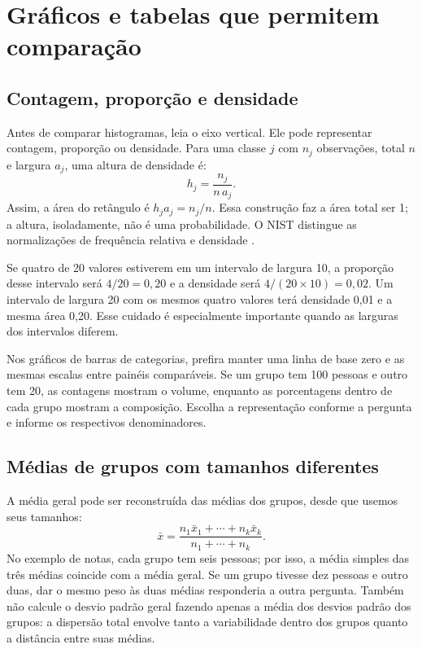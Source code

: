 \section{Gráficos e tabelas que permitem comparação}

\subsection{Contagem, proporção e densidade}

Antes de comparar histogramas, leia o eixo vertical. Ele pode representar contagem, proporção ou densidade. Para uma classe $j$ com $n_j$ observações, total $n$ e largura $a_j$, uma altura de densidade é:
\[
 h_j=\frac{n_j}{n\,a_j}.
\]
Assim, a área do retângulo é $h_j a_j=n_j/n$. Essa construção faz a área total ser 1; a altura, isoladamente, não é uma probabilidade. O NIST distingue as normalizações de frequência relativa e densidade \parencite{NISTHistograma}.

Se quatro de 20 valores estiverem em um intervalo de largura 10, a proporção desse intervalo será $4/20=0{,}20$ e a densidade será $4/(20\times10)=0{,}02$. Um intervalo de largura 20 com os mesmos quatro valores terá densidade 0,01 e a mesma área 0,20. Esse cuidado é especialmente importante quando as larguras dos intervalos diferem.

Nos gráficos de barras de categorias, prefira manter uma linha de base zero e as mesmas escalas entre painéis comparáveis. Se um grupo tem 100 pessoas e outro tem 20, as contagens mostram o volume, enquanto as porcentagens dentro de cada grupo mostram a composição. Escolha a representação conforme a pergunta e informe os respectivos denominadores.

\subsection{Médias de grupos com tamanhos diferentes}

A média geral pode ser reconstruída das médias dos grupos, desde que usemos seus tamanhos:
\[
 \bar x=\frac{n_1\bar x_1+\cdots+n_k\bar x_k}{n_1+\cdots+n_k}.
\]
No exemplo de notas, cada grupo tem seis pessoas; por isso, a média simples das três médias coincide com a média geral. Se um grupo tivesse dez pessoas e outro duas, dar o mesmo peso às duas médias responderia a outra pergunta. Também não calcule o desvio padrão geral fazendo apenas a média dos desvios padrão dos grupos: a dispersão total envolve tanto a variabilidade dentro dos grupos quanto a distância entre suas médias.

